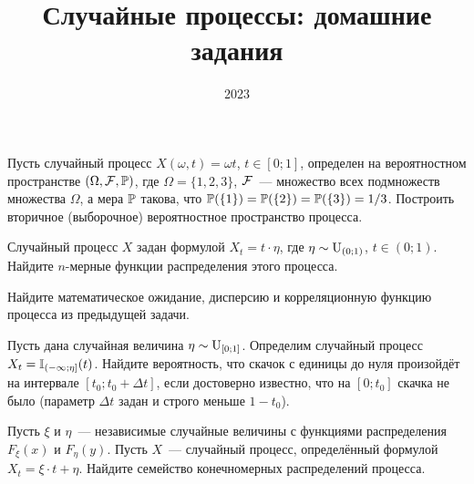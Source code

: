 \documentclass[12pt]{article}
\title{Случайные процессы: домашние задания}
\author{}
\date{2023}
\newcounter{HomeExercise}
\begin{document}

\maketitle

\newpage




\begin{Exercise}[counter=HomeExercise, title={(Задача из канонического задания)}]
    \noindent
    Пусть случайный процесс $ X(\omega, t) = \omega t $, $ t \in [0; 1] $,
    определен на вероятностном пространстве $ (\Omega, \mathcal{F}, \mathbb{P}) $,
    где $ \Omega = \{1, 2, 3\} $, $ \mathcal{F} $~--- множество всех подмножеств множества $ \Omega $,
    а мера $ \mathbb{P} $ такова, что $ \mathbb{P}(\{1\}) = \mathbb{P}(\{2\}) = \mathbb{P}(\{3\}) = 1/3 $.
    Построить вторичное (выборочное) вероятностное пространство процесса.
\end{Exercise}


\begin{Exercise}[counter=HomeExercise]
    \noindent
    Случайный процесс $ X $ задан формулой $ X_t = t \cdot \eta $, где $ \eta \sim \textnormal{U}_{(0; 1)} $, $ t \in (0; 1) $.
    Найдите $ n $-мерные функции распределения этого процесса.
\end{Exercise}


\begin{Exercise}[counter=HomeExercise]
    \noindent
    Найдите математическое ожидание, дисперсию и корреляционную функцию процесса из предыдущей задачи.
\end{Exercise}


\begin{Exercise}[counter=HomeExercise]
    \noindent
    Пусть дана случайная величина $ \eta \sim \textnormal{U}_{[0;1]} $.
    Определим случайный процесс $ X_t = \mathbb{I}_{(-\infty; \eta]}(t) $.
    Найдите вероятность, что скачок с единицы до нуля произойдёт на интервале $ [t_0; t_0 + \Delta t] $,
    если достоверно известно, что на $ [0; t_0] $ скачка не было
    (параметр $ \Delta t $ задан и строго меньше $ 1 - t_0 $).
\end{Exercise}


\begin{Exercise}[counter=HomeExercise]
    \noindent
    Пусть $ \xi $ и $ \eta $~--- независимые случайные величины с функциями распределения $ F_\xi(x) $ и $ F_\eta(y) $.
    Пусть $ X $~--- случайный процесс, определённый формулой $ X_t = \xi \cdot t + \eta $.
    Найдите семейство конечномерных распределений процесса.
\end{Exercise}
\end{document}
